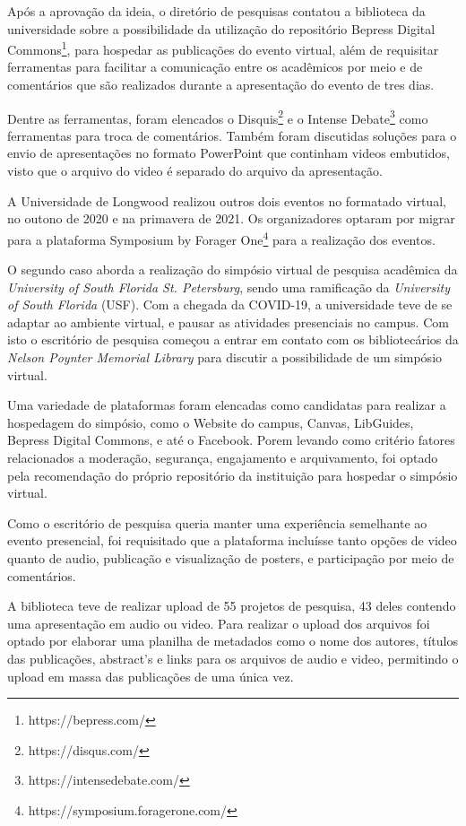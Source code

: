 Após a aprovação da ideia, o diretório de pesquisas contatou a biblioteca da universidade sobre
a possibilidade da utilização do repositório Bepress Digital Commons\footnote{https://bepress.com/},
para hospedar as publicações do evento virtual, além de requisitar ferramentas
para facilitar a comunicação entre os acadêmicos por meio e de comentários
que são realizados durante a apresentação do evento de tres dias.

Dentre as ferramentas, foram elencados o Disquis\footnote{https://disqus.com/}
e o Intense Debate\footnote{https://intensedebate.com/} como ferramentas para troca
de comentários. Também foram discutidas soluções para o envio de apresentações
no formato PowerPoint que continham videos embutidos, visto que o arquivo do video
é separado do arquivo da apresentação.

A Universidade de Longwood realizou outros dois eventos no formatado virtual,
no outono de 2020 e na primavera de 2021. Os organizadores optaram por migrar
para a plataforma Symposium by Forager One\footnote{https://symposium.foragerone.com/}
para a realização dos eventos.

O segundo caso aborda a realização do simpósio virtual de pesquisa acadêmica
da \emph{University of South Florida St. Petersburg}, sendo uma ramificação
da \emph{University of South Florida} (USF). Com a chegada da COVID-19,
a universidade teve de se adaptar ao ambiente virtual, e pausar as atividades
presenciais no campus. Com isto o escritório de pesquisa começou a entrar em contato
com os bibliotecários da \emph{Nelson Poynter Memorial Library} para discutir
a possibilidade de um simpósio virtual.

Uma variedade de plataformas foram elencadas como candidatas para realizar
a hospedagem do simpósio, como o Website do campus, Canvas, LibGuides,
Bepress Digital Commons, e até o Facebook. Porem levando como critério fatores
relacionados a moderação, segurança, engajamento e arquivamento, foi optado
pela recomendação do próprio repositório da instituição para hospedar o
simpósio virtual.

Como o escritório de pesquisa queria manter uma experiência semelhante
ao evento presencial, foi requisitado que a plataforma incluísse tanto opções
de video quanto de audio, publicação e visualização de posters, e participação
por meio de comentários.

A biblioteca teve de realizar upload de 55 projetos de pesquisa, 43 deles
contendo uma apresentação em audio ou video. Para realizar o upload dos arquivos
foi optado por elaborar uma planilha de metadados como o nome dos autores,
títulos das publicações, abstract's e links para os arquivos de audio e video,
permitindo o upload em massa das publicações de uma única vez.

